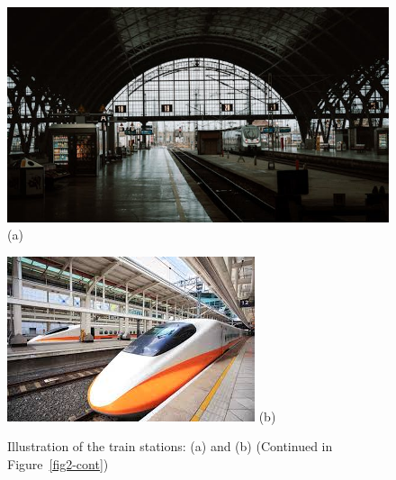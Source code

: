\begin{Chapter}
\begin{figure}[ht]
    \centering
    \begin{minipage}{\linewidth}
        \centering
        \includegraphics[width=\linewidth]{pics/image.jpeg}
        \vspace{0.5ex}
        \small (a)
    \end{minipage}
    \vspace{0.5em}
    
    \begin{minipage}{\linewidth}
        \centering
        \includegraphics[width=\linewidth]{pics/train-station2.jpeg}
        \vspace{0.5ex}
        \small (b)
    \end{minipage}
    \caption{Illustration of the train stations: (a) and (b) (Continued in Figure~\ref{fig2-cont})}
    \label{fig2}
\end{figure}


\end{Chapter}
